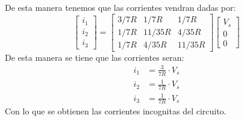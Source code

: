 \documentclass[
  11pt,
  letterpaper,
   addpoints,
   answers
  ]{exam}
\begin{document}
\begin{solution}
\begin{enumerate}
\begin{equation}
    \end{equation}
    De esta manera tenemos que las corrientes vendran dadas por:
    \begin{equation}
        \begin{bmatrix}
            i_1 \\
            i_2 \\
            i_3
        \end{bmatrix}
        =
        \begin{bmatrix}
            3/7R & 1/7R & 1/7R \\
            1/7R & 11/35R & 4/35R \\
            1/7R & 4/35R & 11/35R
        \end{bmatrix}
        \begin{bmatrix}
            V_s \\
            0 \\
            0
        \end{bmatrix}
    \end{equation}
    De esta manera se tiene que las corrientes seran:
    \begin{align}
        i_1 &= \frac{3}{7R} \cdot V_s \\
        i_2 &= \frac{1}{7R} \cdot V_s \\
        i_3 &= \frac{1}{7R} \cdot V_s
    \end{align}
    Con lo que se obtienen las corrientes incognitas del circuito.
    \end{enumerate}
\end{solution}
\end{document}
